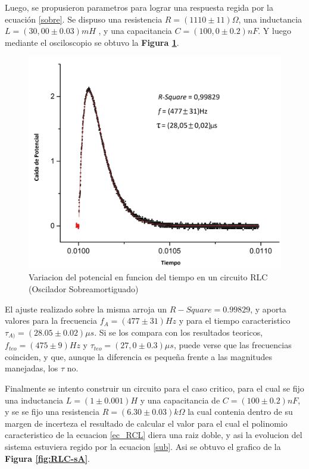 \documentclass[11pt,a4paper]{article}
\begin{document}
Luego, se propusieron parametros para lograr una respuesta regida por la ecuación \eqref{sobre}. Se dispuso una resistencia $R= (1110 \pm 11)\Omega$, una inductancia $L = (30,00 \pm 0.03) mH$ , y una capacitancia $C = (100,0 \pm 0.2) nF$. Y luego mediante el osciloscopio se obtuvo la \textbf{Figura \ref{fig:RLC-SA}}.

\begin{figure}[H]
\centering
\includegraphics[scale=0.49]{RLC-SobreAmortiguado}
  \caption{Variacion del potencial en funcion del tiempo en un circuito RLC (Oscilador Sobreamortiguado)}
  \label{fig:RLC-SA}
\end{figure}

El ajuste realizado sobre la misma arroja un $R-Square = 0.99829$, y aporta valores para la frecuencia \textbf{$f_{A} = (477 \pm 31)Hz$} y para el tiempo caracteristico \textbf{$\tau_{A)} = (28.05 \pm 0.02) \mu s$}. Si se los compara con los resultados teoricos, \textbf{$f_{teo} = (475 \pm 9)Hz$} y \textbf{$\tau_{teo} = (27,0 \pm 0.3) \mu s$}, puede verse que las frecuencias coinciden, y que, aunque la diferencia es pequeña frente a las magnitudes manejadas, los $\tau$ no.

Finalmente se intento construir un circuito para el caso critico, para el cual se fijo una inductancia $L= (1 \pm 0.001) H$ y una capacitancia de  $C = (100 \pm 0.2) nF$, y se se fijo una resistencia $R = (6.30 \pm 0.03) k\Omega$ la cual contenia dentro de su margen de incerteza el resultado de calcular el valor para el cual el polinomio caracteristico de la ecuacion \eqref{ec_RCL} diera una raiz doble, y asi la evolucion del sistema estuviera regido por la ecuacion \eqref{sub}. Asi se obtuvo el grafico de la \textbf{Figura \ref{fig:RLC-sA}}.
\end{document}
